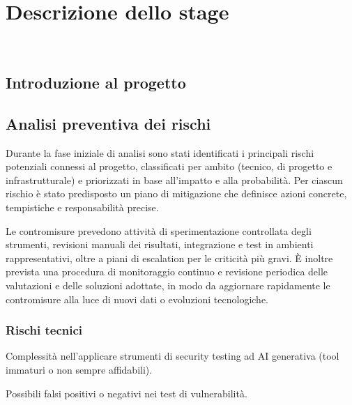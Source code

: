 \chapter{Descrizione dello stage}
\label{cap:descrizione-stage}

\\

\section{Introduzione al progetto}


\section{Analisi preventiva dei rischi}

Durante la fase iniziale di analisi sono stati identificati i principali rischi potenziali connessi al progetto, classificati per ambito (tecnico, di progetto e infrastrutturale) e priorizzati in base all'impatto e alla probabilità. Per ciascun rischio è stato predisposto un piano di mitigazione che definisce azioni concrete, tempistiche e responsabilità precise.

Le contromisure prevedono attività di sperimentazione controllata degli strumenti, revisioni manuali dei risultati, integrazione e test in ambienti rappresentativi, oltre a piani di escalation per le criticità più gravi. È inoltre prevista una procedura di monitoraggio continuo e revisione periodica delle valutazioni e delle soluzioni adottate, in modo da aggiornare rapidamente le contromisure alla luce di nuovi dati o evoluzioni tecnologiche.

\subsection{Rischi tecnici}

\begin{risk}{Complessità nell'applicare strumenti di security testing ad AI generativa (tool immaturi o
non sempre affidabili).}
\end{risk}

\begin{risk}{Possibili falsi positivi o negativi nei test di vulnerabilità.}
\end{risk}

